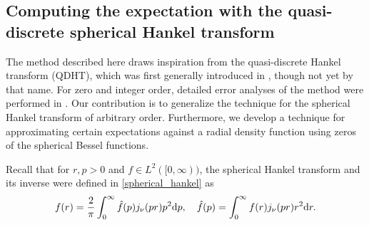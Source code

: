 \documentclass[../../main.tex]{subfiles}
\begin{document}
\begin{refsection}
	\section[The quasi-discrete spherical Hankel transform]{Computing the expectation with the quasi-discrete spherical Hankel transform}

	The method described here draws inspiration from the quasi-discrete Hankel transform (QDHT), which was first generally introduced in \cite{johnsonImprovedMethodComputing1987}, though not yet by that name.
	For zero and integer order, detailed error analyses of the method were performed in \cite{yuQuasidiscreteHankelTransform1998,guizar-sicairosComputationQuasidiscreteHankel2004}.
	Our contribution is to generalize the technique for the spherical Hankel transform of arbitrary order.
	Furthermore, we develop a technique for approximating certain expectations against a radial density function using zeros of the spherical Bessel functions.

	Recall that for $r,p > 0$ and $f \in L^2([0, \infty))$, the spherical Hankel transform and its inverse were defined in \cref{spherical_hankel} as
	\begin{equation*}
		f(r) = \frac{2}{\pi}\int_0^\infty \hat{f}(p) j_\nu(p r) p^2 \dd p, \quad \hat{f}(p) = \int_0^\infty f(r) j_\nu(p r) r^2 \dd r.
	\end{equation*}


\end{refsection}
\end{document}

